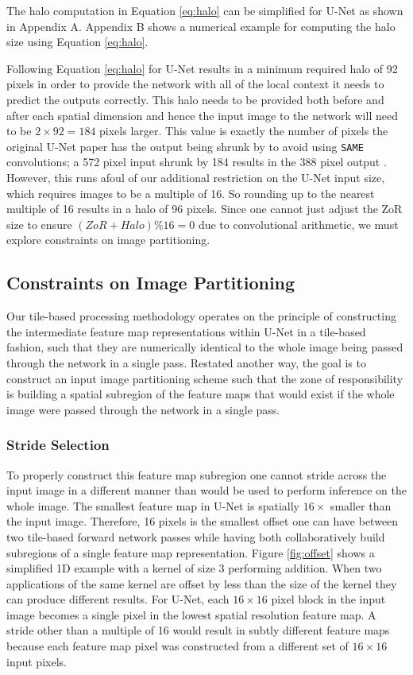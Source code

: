 \documentclass[twoside,11pt]{article}
\begin{document}
The halo computation in Equation \ref{eq:halo} can be simplified for U-Net as shown in Appendix A. Appendix B shows a numerical example for computing the halo size using Equation \ref{eq:halo}.

Following Equation \ref{eq:halo} for U-Net results in a minimum required halo of 92 pixels in order to provide the network with all of the local context it needs to predict the outputs correctly. This halo needs to be provided both before and after each spatial dimension and hence the input image to the network will need to be $2 \times 92 = 184$ pixels larger. This value is exactly the number of pixels the original U-Net paper has the output being shrunk by to avoid using \texttt{SAME} convolutions; a 572 pixel input shrunk by 184 results in the 388 pixel output \citep{Ronneberger2015a}. 
However, this runs afoul of our additional restriction on the U-Net input size, which requires images to be a multiple of 16. So rounding up to the nearest multiple of 16 results in a halo of 96 pixels. Since  one cannot just adjust the ZoR size to ensure $(ZoR + Halo) \% 16 = 0$ due to convolutional arithmetic, we must explore constraints on image partitioning. 

\subsection{Constraints on Image Partitioning}

Our tile-based processing methodology operates on the principle of constructing the intermediate feature map representations within U-Net in a tile-based fashion, such that they are numerically identical to the whole image being passed through the network in a single pass. Restated another way, the goal is to construct an input image partitioning scheme such that the zone of responsibility is building a spatial subregion of the feature maps that would exist if the whole image were passed through the network in a single pass. 

\subsubsection{Stride Selection}
To properly construct this feature map subregion one cannot stride across the input image in a different manner than would be used to perform inference on the whole image. The smallest feature map in U-Net is spatially $16 \times$ smaller than the input image. Therefore, 16 pixels is the smallest offset one can have between two tile-based forward network passes while having both collaboratively build subregions of a single feature map representation. Figure \ref{fig:offset} shows a simplified 1D example with a kernel of size 3 performing addition. When two applications of the same kernel are offset by less than the size of the kernel they can produce different results. 
For U-Net, each $16 \times 16$ pixel block in the input image becomes a single pixel in the lowest spatial resolution feature map. A stride other than a multiple of 16 would result in subtly different feature maps because each feature map pixel was constructed from a different set of $16 \times 16$ input pixels. 
\end{document}
